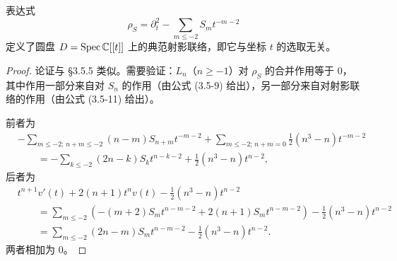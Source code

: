 \begin{lemma}
    表达式
    \[
        \rho_S=\partial_t^2-\sum_{m\le -2}S_m t^{-m-2}
    \]
    定义了圆盘 $D=\operatorname{Spec}\mathbb{C}[[t]]$ 上的典范射影联络，即它与坐标 $t$ 的选取无关。
\end{lemma}

\begin{proof}
    论证与 §3.5.5 类似。需要验证：$L_n$（$n\ge -1$）对 $\rho_S$ 的合并作用等于 0，其中作用一部分来自对 $S_n$ 的作用（由公式 (3.5-9) 给出），另一部分来自对射影联络的作用（由公式 (3.5-11) 给出）。

    前者为
    \begin{align*}
        &-\sum_{m\le-2;\,n+m\le-2}(n-m)S_{n+m}t^{-m-2}
         +\sum_{m\le-2;\,n+m=0}\frac12(n^3-n)t^{-m-2}\\
        &\qquad=-\sum_{k\le-2}(2n-k)S_k t^{n-k-2}+\frac12(n^3-n)t^{n-2},
    \end{align*}
    后者为
    \begin{align*}
        &t^{n+1}v'(t)+2(n+1)t^n v(t)-\frac12(n^3-n)t^{n-2}\\
        &\qquad=\sum_{m\le-2}\left(-(m+2)S_m t^{n-m-2}+2(n+1)S_m t^{n-m-2}\right)
          -\frac12(n^3-n)t^{n-2}\\
        &\qquad=\sum_{m\le-2}(2n-m)S_m t^{n-m-2}-\frac12(n^3-n)t^{n-2}.
    \end{align*}
    两者相加为 0。
\end{proof}


